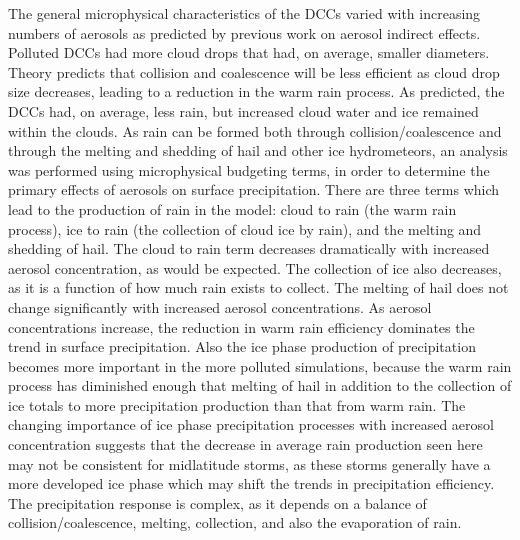 The general microphysical characteristics of the DCCs varied with increasing numbers of aerosols as predicted by previous work on aerosol indirect effects.  Polluted DCCs had more cloud drops that had, on average, smaller diameters.  Theory predicts that collision and coalescence will be less efficient as cloud drop size decreases, leading to a reduction in the warm rain process.  As predicted, the DCCs had, on average, less rain, but increased cloud water and ice remained within the clouds.  
\newpage
As rain can be formed both through collision/coalescence and through the melting and shedding of hail and other ice hydrometeors, an analysis was performed using microphysical budgeting terms, in order to determine the primary effects of aerosols on surface precipitation.  There are three terms which lead to the production of rain in the model: cloud to rain (the warm rain process), ice to rain (the collection of cloud ice by rain), and the melting and shedding of hail.  The cloud to rain term decreases dramatically with increased aerosol concentration, as would be expected.  The collection of ice also decreases, as it is a function of how much rain exists to collect.  The melting of hail does not change significantly with increased aerosol concentrations.  As aerosol concentrations increase, the reduction in warm rain efficiency dominates the trend in surface precipitation.  Also the ice phase production of precipitation becomes more important in the more polluted simulations, because the warm rain process has diminished enough that melting of hail in addition to the collection of ice totals to more precipitation production than that from warm rain.  The changing importance of ice phase precipitation processes with increased aerosol concentration suggests that the decrease in average rain production seen here may not be consistent for midlatitude storms, as these storms generally have a more developed ice phase which may shift the trends in precipitation efficiency.  The precipitation response is complex, as it depends on a balance of collision/coalescence, melting, collection, and also the evaporation of rain.  

